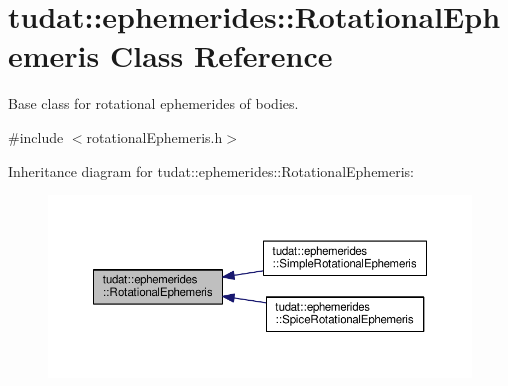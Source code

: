 \hypertarget{classtudat_1_1ephemerides_1_1RotationalEphemeris}{}\section{tudat\+:\+:ephemerides\+:\+:Rotational\+Ephemeris Class Reference}
\label{classtudat_1_1ephemerides_1_1RotationalEphemeris}


Base class for rotational ephemerides of bodies.  




{\ttfamily \#include $<$rotational\+Ephemeris.\+h$>$}



Inheritance diagram for tudat\+:\+:ephemerides\+:\+:Rotational\+Ephemeris\+:
\nopagebreak
\begin{figure}[H]
\begin{center}
\leavevmode
\includegraphics[width=350pt]{classtudat_1_1ephemerides_1_1RotationalEphemeris__inherit__graph}
\end{center}
\end{figure}
